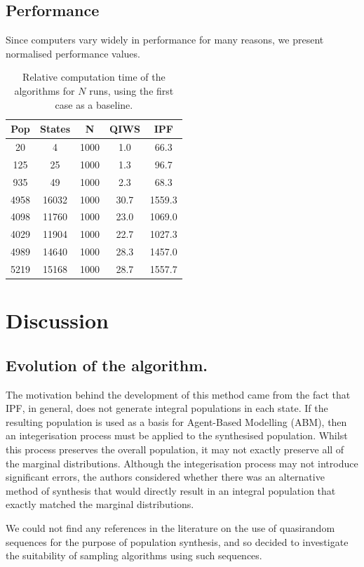 \documentclass{JASSS}
\begin{document}
\subsection{Performance}\label{performance}

Since computers vary widely in performance for many reasons, we present
normalised performance values.

\begin{table}[!t]
	\centering
	\begin{tabular}{c|c|c|c|c}
	\toprule
	Pop & States & N & QIWS & IPF\tabularnewline
	\midrule
	20 & 4 & 1000 & 1.0 & 66.3\tabularnewline
	125 & 25 & 1000 & 1.3 & 96.7\tabularnewline
	935 & 49 & 1000 & 2.3 & 68.3\tabularnewline
	4958 & 16032 & 1000 & 30.7 & 1559.3\tabularnewline
	4098 & 11760 & 1000 & 23.0 & 1069.0\tabularnewline
	4029 & 11904 & 1000 & 22.7 & 1027.3\tabularnewline
	4989 & 14640 & 1000 & 28.3 & 1457.0\tabularnewline
	5219 & 15168 & 1000 & 28.7 & 1557.7\tabularnewline
	\bottomrule			
	\end{tabular}
	\caption{Relative computation time of the algorithms for \(N\) runs, using the first case as a baseline.}
	\label{tab:}	
\end{table}

\section{Discussion}\label{discussion}

\subsection{Evolution of the
algorithm.}\label{evolution-of-the-algorithm.}

The motivation behind the development of this method came from the fact
that IPF, in general, does not generate integral populations in each
state. If the resulting population is used as a basis for Agent-Based
Modelling (ABM), then an integerisation process must be applied to the
synthesised population. Whilst this process preserves the overall
population, it may not exactly preserve all of the marginal
distributions. Although the integerisation process may not introduce significant errors, the
authors considered whether there was an alternative method of synthesis
that would directly result in an integral population that exactly
matched the marginal distributions.

We could not find any references in the literature on the use of
quasirandom sequences for the purpose of population synthesis, and so
decided to investigate the suitability of sampling algorithms using such
sequences.
\end{document}
